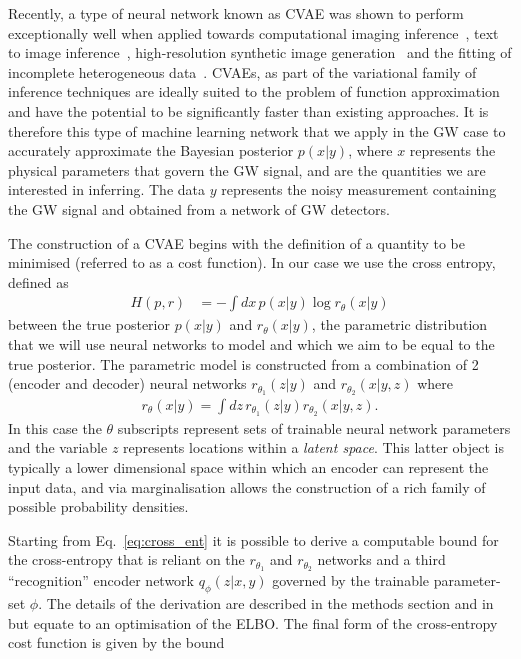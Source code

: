 %
%
Recently, a type of neural network known as \ac{CVAE} was shown to perform
exceptionally well when applied towards computational imaging
inference~\cite{1904.06264,NIPS2015_5775}, text to image
inference~\cite{1512.00570}, high-resolution synthetic image
generation~\cite{1612.00005} and the fitting of incomplete heterogeneous
data~\cite{1807.03653}. \acp{CVAE}, as part of the variational family of
inference techniques are ideally suited to the problem of function
approximation and have the potential to be significantly faster than existing
approaches. It is therefore this type of machine learning network that we
apply in the \ac{GW} case to accurately approximate the Bayesian posterior
$p(x|y)$, where $x$ represents the physical parameters that govern the
\ac{GW} signal, and are the quantities we are interested in inferring. The data
$y$ represents the noisy measurement containing the \ac{GW} signal and obtained
from a network of \ac{GW} detectors. 

%
%
The construction of a \ac{CVAE} begins with the definition of a quantity to be
minimised (referred to as a cost function). In our case we use the cross
entropy, defined as
%
\begin{align}\label{eq:cross_ent} 
H(p,r) &= -\int dx\, p(x|y) \log r_{\theta}(x|y) 
\end{align}
%
between the true posterior $p(x|y)$ and $r_{\theta}(x|y)$, the parametric
distribution that we will use neural networks to model and which we aim
to be equal to the true posterior. The parametric model is
constructed from a combination of 2 (encoder and decoder) neural networks
$r_{\theta_1}(z|y)$ and $r_{\theta_2}(x|y,z)$ where
%
\begin{align}\label{eq:latent_model}
r_{\theta}(x|y) = \int dz\,r_{\theta_1}(z|y)r_{\theta_2}(x|y,z).
\end{align}
%
In this case the $\theta$ subscripts represent sets of trainable neural network
parameters and the variable $z$ represents locations within a \emph{latent
space}. This latter object is typically a lower dimensional space within which
an encoder can represent the input data, and via marginalisation allows the
construction of a rich family of possible probability densities.

Starting from Eq.~\ref{eq:cross_ent} it is possible to derive a
computable bound for the cross-entropy that is reliant on the
$r_{\theta_1}$ and $r_{\theta_2}$ networks and a third ``recognition'' encoder
network $q_{\phi}(z|x,y)$ governed by the trainable parameter-set $\phi$. The
details of the derivation are described in the methods section and
in~\cite{1904.06264} but equate to an optimisation of the \ac{ELBO}. The
final form of the cross-entropy cost function is given by the bound

